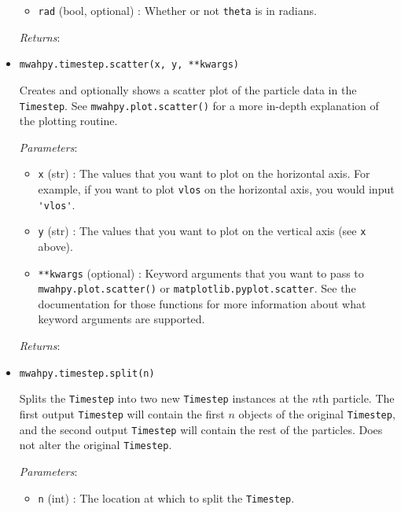 \documentclass{article}
\begin{document}
\begin{itemize}
\begin{itemize}
\item \verb!rad! (bool, optional) : Whether or not \verb!theta! is in radians.

\end{itemize}

\textit{Returns}: 



\item \verb!mwahpy.timestep.scatter(x, y, **kwargs)!

Creates and optionally shows a scatter plot of the particle data in the \verb!Timestep!. See \verb!mwahpy.plot.scatter()! for a more in-depth explanation of the plotting routine.

\textit{Parameters}: \begin{itemize}

\item \verb!x! (str) : The values that you want to plot on the horizontal axis. For example, if you want to plot \verb!vlos! on the horizontal axis, you would input \verb!'vlos'!.

\item \verb!y! (str) : The values that you want to plot on the vertical axis (see \verb!x! above).

\item \verb!**kwargs! (optional) : Keyword arguments that you want to pass to \verb!mwahpy.plot.scatter()! or \verb!matplotlib.pyplot.scatter!. See the documentation for those functions for more information about what keyword arguments are supported.

\end{itemize}

\textit{Returns}: 



\item \verb!mwahpy.timestep.split(n)!

Splits the \verb!Timestep! into two new \verb!Timestep! instances at the $n$th particle. The first output \verb!Timestep! will contain the first $n$ objects of the original \verb!Timestep!, and the second output \verb!Timestep! will contain the rest of the particles. Does not alter the original \verb!Timestep!. 

\textit{Parameters}: \begin{itemize}

\item \verb!n! (int) : The location at which to split the \verb!Timestep!. 

\end{itemize}


\end{itemize}
\end{document}
